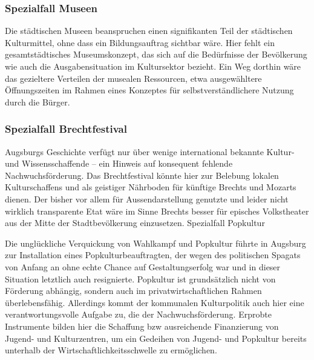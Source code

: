 \documentclass[a5paper, twoside, ngerman, 10pt]{scrbook}
\begin{document}
   \subsubsection{Spezialfall Museen}
   
   Die städtischen Museen beanspruchen einen signifikanten Teil der 
   städtischen Kulturmittel, ohne dass ein Bildungsauftrag sichtbar wäre. Hier 
   fehlt ein gesamtstädtisches Museumskonzept, das sich auf die Bedürfnisse 
   der Bevölkerung wie auch die Ausgabensituation im Kultursektor bezieht. Ein 
   Weg dorthin wäre das gezieltere Verteilen der musealen Ressourcen, etwa 
   ausgewähltere Öffnungszeiten im Rahmen eines Konzeptes für 
   selbstverständlichere Nutzung durch die Bürger.
   
   \subsubsection{Spezialfall Brechtfestival}
   
   Augsburgs Geschichte verfügt nur über wenige international bekannte Kultur- 
   und Wissensschaffende – ein Hinweis auf konsequent fehlende 
   Nachwuchsförderung. Das Brechtfestival könnte hier zur Belebung lokalen 
   Kulturschaffens und als geistiger Nährboden für künftige Brechts und 
   Mozarts dienen. Der bisher vor allem für Aussendarstellung genutzte und 
   leider nicht wirklich transparente Etat wäre im Sinne Brechts besser für 
   episches Volkstheater aus der Mitte der Stadtbevölkerung einzusetzen.
   Spezialfall Popkultur
   
   Die unglückliche Verquickung von Wahlkampf und Popkultur führte in Augsburg 
   zur Installation eines Popkulturbeauftragten, der wegen des politischen 
   Spagats von Anfang an ohne echte Chance auf Gestaltungserfolg war und in 
   dieser Situation letztlich auch resignierte. Popkultur ist grundsätzlich 
   nicht von Förderung abhängig, sondern auch im privatwirtschaftlichen Rahmen 
   überlebensfähig. Allerdings kommt der kommunalen Kulturpolitik auch hier 
   eine verantwortungsvolle Aufgabe zu, die der Nachwuchsförderung. Erprobte 
   Instrumente bilden hier die Schaffung bzw ausreichende Finanzierung von 
   Jugend- und Kulturzentren, um ein Gedeihen von Jugend- und Popkultur 
   bereits unterhalb der Wirtschaftlichkeitsschwelle zu ermöglichen. 
\end{document}

